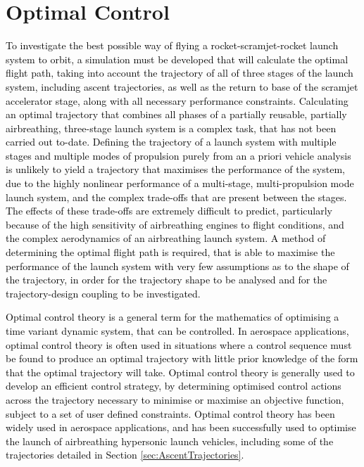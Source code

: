 


\section{Optimal Control}\label{sec:Optimisation}





\textcolor{black}{To investigate the best possible way of flying a rocket-scramjet-rocket launch system to orbit, a simulation must be developed that will calculate the optimal flight path, taking into account the trajectory of all of three stages of the launch system, including ascent trajectories, as well as the return to base of the scramjet accelerator stage, along with all necessary performance constraints. Calculating an optimal trajectory that combines all phases of a partially reusable, partially airbreathing, three-stage launch system is a complex task, that has not been carried out to-date.
Defining the trajectory of a launch system with multiple stages and multiple modes of propulsion purely from an a priori vehicle analysis is unlikely to yield a trajectory that maximises the performance of the system, due to the highly nonlinear performance of a multi-stage, multi-propulsion mode launch system, and the complex trade-offs that are present between the stages. The effects of these trade-offs are extremely difficult to predict, particularly because of the high sensitivity of airbreathing engines to flight conditions, and the complex aerodynamics of an airbreathing launch system. 
A method of determining the optimal flight path is required, that is able to maximise the performance of the launch system with very few assumptions as to the shape of the trajectory, in order for the trajectory shape to be analysed and for the trajectory-design coupling to be investigated. 
}

\textcolor{black}{
Optimal control theory is a general term for the mathematics of optimising a time variant dynamic system, that can be controlled. 
In aerospace applications, optimal control theory is often used in situations where a control sequence must be found to produce an optimal trajectory with little prior knowledge of the form that the optimal trajectory will take. 
Optimal control theory is generally used to develop an efficient control strategy, by determining optimised control actions across the trajectory necessary to minimise or maximise an objective function, subject to a set of user defined constraints.  
Optimal control theory has been widely used in aerospace applications, and has been successfully used to optimise the launch of airbreathing hypersonic launch vehicles\cite{Powell1991,Lu1993,Trefny1999,Roche2000,Pescetelli2012,Young2006}, including some of the trajectories detailed in Section \ref{sec:AscentTrajectories}. 
}

